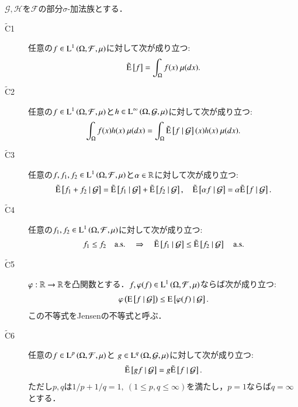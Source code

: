 	\begin{screen}
		\begin{prp}[拡張条件付き期待値の性質]
		$\mathcal{G},\mathcal{H}$を$\mathcal{F}$の部分$\sigma$-加法族とする．
		\begin{description}
			\item[$\tilde{\mathrm{C}}$1] 任意の$f \in \operatorname{L}^{1} \left(\Omega, \mathcal{F},\mu\right)$に対して次が成り立つ:
				\begin{align}
					\tilde{\operatorname{E}} \left[ f \right] = \int_{\Omega} f(x)\ \mu(dx).
				\end{align}
				
			\item[$\tilde{\mathrm{C}}$2]	任意の$f \in \operatorname{L}^{1} \left(\Omega, \mathcal{F},\mu\right)$と$h \in \operatorname{L}^{\infty} \left(\Omega, \mathcal{G},\mu\right)$に対して次が成り立つ:
				\begin{align}
					\int_{\Omega} f(x)h(x)\ \mu(dx) = \int_{\Omega} \tilde{\operatorname{E}} \left[ f \ \middle|\ \mathcal{G} \right](x)h(x)\ \mu(dx).
				\end{align}
				
			\item[$\tilde{\mathrm{C}}$3]	任意の$f,f_1,f_2 \in \operatorname{L}^{1} \left(\Omega, \mathcal{F},\mu\right)$と$\alpha \in \mathbb{R}$に対して次が成り立つ:
				\begin{align}
					\tilde{\operatorname{E}} \left[ f_1 + f_2 \ \middle|\ \mathcal{G} \right] = \tilde{\operatorname{E}} \left[ f_1 \ \middle|\ \mathcal{G} \right] + \tilde{\operatorname{E}} \left[ f_2 \ \middle|\ \mathcal{G} \right],
					\quad \tilde{\operatorname{E}} \left[ \alpha f \ \middle|\ \mathcal{G} \right] = \alpha \tilde{\operatorname{E}} \left[ f \ \middle|\ \mathcal{G} \right].
				\end{align}

			\item[$\tilde{\mathrm{C}}$4]	任意の$f_1,f_2 \in \operatorname{L}^{1} \left(\Omega, \mathcal{F},\mu\right)$に対して次が成り立つ:
				\begin{align}
					f_1 \leq f_2 \quad \mathrm{a.s.} \quad \Rightarrow \quad \tilde{\operatorname{E}} \left[ f_1 \ \middle|\ \mathcal{G} \right] \leq \tilde{\operatorname{E}} \left[ f_2 \ \middle|\ \mathcal{G} \right] \quad \mathrm{a.s.}
				\end{align}
			
			\item[$\tilde{\mathrm{C}}$5] $\varphi:\mathbb{R} \rightarrow \mathbb{R}$を凸関数とする．$f,\varphi(f) \in \operatorname{L}^{1} \left(\Omega, \mathcal{F},\mu\right)$ならば次が成り立つ:
				\begin{align}
					\varphi\left( \operatorname{E} \left[ f \ \middle|\ \mathcal{G} \right] \right) \leq \operatorname{E} \left[ \varphi(f) \ \middle|\ \mathcal{G} \right].
				\end{align}
				この不等式をJensenの不等式と呼ぶ．
				
			\item[$\tilde{\mathrm{C}}$6]	任意の$f \in \operatorname{L}^{p} \left(\Omega, \mathcal{F},\mu\right)$と
				$g \in \operatorname{L}^{q} \left(\Omega, \mathcal{G},\mu\right)$に対して次が成り立つ:
				\begin{align}
					\tilde{\operatorname{E}} \left[ gf \ \middle|\ \mathcal{G} \right] = g\tilde{\operatorname{E}} \left[ f \ \middle|\ \mathcal{G} \right].
				\end{align}
				ただし$p,q$は$1/p + 1/q = 1,\ (1 \leq p,q \leq \infty)$を満たし，$p = 1$ならば$q = \infty$とする．
				

\end{description}
\end{prp}
\end{screen}
